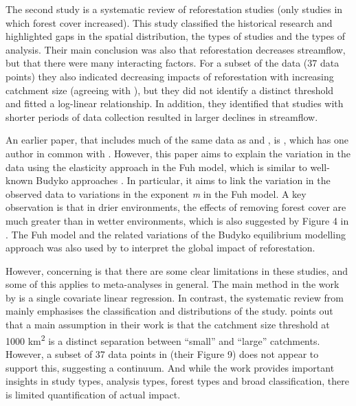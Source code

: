 \documentclass[]{elsarticle} %
\begin{document}
The second study \citep{filoso2017} is a systematic review of reforestation studies (only studies in which forest cover increased). This study classified the historical research and highlighted gaps in the spatial distribution, the types of studies and the types of analysis. Their main conclusion was also that reforestation decreases streamflow, but that there were many interacting factors. For a subset of the data (37 data points) they also indicated decreasing impacts of reforestation with increasing catchment size (agreeing with \citet{zhang2017}), but they did not identify a distinct threshold and fitted a log-linear relationship. In addition, they identified that studies with shorter periods of data collection resulted in larger declines in streamflow.

An earlier paper, that includes much of the same data as \citet{zhang2017} and \citet{filoso2017}, is \citet{zhou2015}, which has one author in common with \citet{zhang2017}. However, this paper aims to explain the variation in the data using the elasticity approach in the Fuh model, which is similar to well-known Budyko approaches \citep{zhang2018elasticity}. In particular, it aims to link the variation in the observed data to variations in the exponent \emph{m} in the Fuh model. A key observation is that in drier environments, the effects of removing forest cover are much greater than in wetter environments, which is also suggested by Figure 4 in \citet{zhang2017}. The Fuh model and the related variations of the Budyko equilibrium modelling approach was also used by \citet{hoekvandijke2022} to interpret the global impact of reforestation.

However, concerning is that there are some clear limitations in these studies, and some of this applies to meta-analyses in general. The main method in the work by \citet{zhang2017} is a single covariate linear regression. In contrast, the systematic review from \citet{filoso2017} mainly emphasises the classification and distributions of the study. \citet{zhang2017} points out that a main assumption in their work is that the catchment size threshold at 1000 km\textsuperscript{2} is a distinct separation between ``small'' and ``large'' catchments. However, a subset of 37 data points in \citet{filoso2017} (their Figure 9) does not appear to support this, suggesting a continuum. And while the work \citet{filoso2017} provides important insights in study types, analysis types, forest types and broad classification, there is limited quantification of actual impact.
\end{document}
